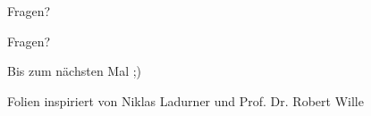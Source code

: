 \documentclass[
  german,            %
  aspectratio=169,    %
]{tumbeamer}
\begin{document}
\begin{frame}[c, fragile]{}{}
	\begin{center}
		\LARGE Fragen?
	\end{center}
\end{frame}

\begin{frame}[c]{}{} 
  \begin{center}
    \LARGE Fragen?
  \end{center}
  \vspace{0.5cm}
  \begin{center}
    \LARGE Bis zum nächsten Mal ;) \\
  \end{center}
  \vspace{1.0cm}
  \begin{center}
    \small Folien inspiriert von Niklas Ladurner und Prof. Dr. Robert Wille
  \end{center}
\end{frame}
\end{document}
